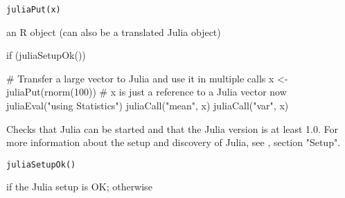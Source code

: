 %
\begin{Usage}
\begin{verbatim}
juliaPut(x)
\end{verbatim}
\end{Usage}
%
\begin{Arguments}
\begin{ldescription}
\item[\code{x}] an R object (can also be a translated Julia object)
\end{ldescription}
\end{Arguments}
%
\begin{Examples}
\begin{ExampleCode}
if (juliaSetupOk()) {

   # Transfer a large vector to Julia and use it in multiple calls
   x <- juliaPut(rnorm(100))
   # x is just a reference to a Julia vector now
   juliaEval("using Statistics")
   juliaCall("mean", x)
   juliaCall("var", x)

}


\end{ExampleCode}
\end{Examples}
%
\begin{Description}\relax
Checks that Julia can be started and that the Julia version is at least 1.0.
For more information about the setup and discovery of Julia,
see , section "Setup".
\end{Description}
%
\begin{Usage}
\begin{verbatim}
juliaSetupOk()
\end{verbatim}
\end{Usage}
%
\begin{Value}
 if the Julia setup is OK; otherwise 
\end{Value}